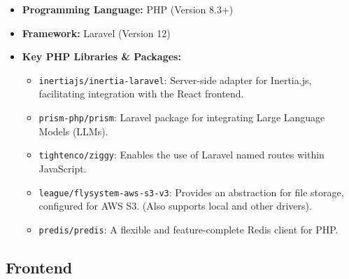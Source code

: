 \documentclass[12pt,a4paper]{article}
\begin{document}
\begin{itemize}
    \item \textbf{Programming Language:} PHP (Version 8.3+)
    \item \textbf{Framework:} Laravel (Version 12)
    \item \textbf{Key PHP Libraries \& Packages:}
    \begin{itemize}
        \item \texttt{inertiajs/inertia-laravel}: Server-side adapter for Inertia.js, facilitating integration with the React frontend.
        \item \texttt{prism-php/prism}: Laravel package for integrating Large Language Models (LLMs).
        \item \texttt{tightenco/ziggy}: Enables the use of Laravel named routes within JavaScript.
        \item \texttt{league/flysystem-aws-s3-v3}: Provides an abstraction for file storage, configured for AWS S3. (Also supports local and other drivers).
        \item \texttt{predis/predis}: A flexible and feature-complete Redis client for PHP.
    \end{itemize}
\end{itemize}

\subsection*{Frontend}
\end{document}
